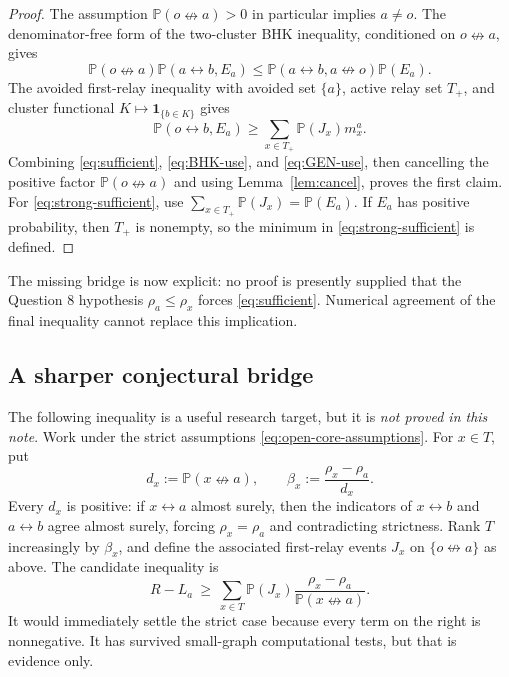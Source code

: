 \documentclass[11pt]{article}
\theoremstyle{definition}
\newcommand{\PP}{\mathbb P}
\newcommand{\con}{\leftrightarrow}
\newcommand{\ncon}{\nleftrightarrow}
\newcommand{\1}{\mathbf 1}
\begin{document}
\begin{proof}
The assumption \(\PP(o\ncon a)>0\) in particular implies \(a\ne o\).
The denominator-free form of the two-cluster BHK inequality, conditioned
on \(o\ncon a\), gives
\begin{equation}\label{eq:BHK-use}
 \PP(o\ncon a)\PP(a\con b,E_a)
 \le \PP(a\con b,a\ncon o)\PP(E_a).
\end{equation}
The avoided first-relay inequality with avoided set \(\{a\}\), active
relay set \(T_+\), and cluster functional
\(K\mapsto\1_{\{b\in K\}}\) gives
\begin{equation}\label{eq:GEN-use}
 \PP(o\con b,E_a)\ge\sum_{x\in T_+}\PP(J_x)m_x^a.
\end{equation}
Combining \eqref{eq:sufficient}, \eqref{eq:BHK-use}, and
\eqref{eq:GEN-use}, then cancelling the positive factor
\(\PP(o\ncon a)\) and using Lemma~\ref{lem:cancel}, proves the first claim.
For \eqref{eq:strong-sufficient}, use
\(\sum_{x\in T_+}\PP(J_x)=\PP(E_a)\).  If \(E_a\) has positive
probability, then \(T_+\) is nonempty, so the minimum in
\eqref{eq:strong-sufficient} is defined.
\end{proof}

The missing bridge is now explicit: no proof is presently supplied that
the Question 8 hypothesis \(\rho_a\le\rho_x\) forces
\eqref{eq:sufficient}.  Numerical agreement of the final inequality cannot
replace this implication.

\subsection{A sharper conjectural bridge}

The following inequality is a useful research target, but it is
\emph{not proved in this note}.  Work under the strict assumptions
\eqref{eq:open-core-assumptions}.  For \(x\in T\), put
\begin{equation}\label{eq:beta}
 d_x:=\PP(x\ncon a),\qquad
 \beta_x:=\frac{\rho_x-\rho_a}{d_x}.
\end{equation}
Every \(d_x\) is positive: if \(x\con a\) almost surely, then the
indicators of \(x\con b\) and \(a\con b\) agree almost surely, forcing
\(\rho_x=\rho_a\) and contradicting strictness.  Rank \(T\) increasingly
by \(\beta_x\), and define the associated first-relay events \(J_x\) on
\(\{o\ncon a\}\) as above.  The candidate inequality is
\begin{equation}\label{eq:conjectural-bridge}
 \boxed{
 R-L_a\ \ge\ \sum_{x\in T}\PP(J_x)
       \frac{\rho_x-\rho_a}{\PP(x\ncon a)}.}
\end{equation}
It would immediately settle the strict case because every term on the
right is nonnegative.  It has survived small-graph computational tests,
but that is evidence only.
\end{document}
